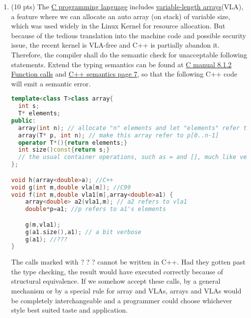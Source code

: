 \documentclass[10pt]{article}
\newcommand{\infertext}[2]{\infer{{\textrm{#1}}}{#2}}
\begin{document}
\begin{enumerate}
\begin{enumerate}
\begin{enumerate}
    \item (2 pts) \textsf{e1[e2]}
    \\
    \[
      \infertext{O,M,C $\vdash$ e1[e2]: Array(A)}{O,M,C \vdash e_1: Array(A) \quad O,M,C \vdash  e_2: Int}
    \]
    \item (4 pts) \textsf{e1[e2] $<$- e3}. Assume the type of the whole expression is the type of \textsf{e1}.
    \\
    \[
      \infertext{O,M,C $\vdash$ e1[e2] $<$- e3 : Array(A)}{O,M,C \vdash e_1: Array(A) \quad O,M,C \vdash  e_2: Int \quad O,M,C \vdash  e_3: T' \quad T' \leq A}
    \]
\end{enumerate}
\end{enumerate}
\item (10 pts) The \href{http://www.open-std.org/jtc1/sc22/wg14/www/docs/n1124.pdf}{C programming language} includes \href{https://outflux.net/slides/2018/lss/danger.pdf}{variable-length arrays}(VLA), a feature where we can allocate an auto array (on stack) of variable size, which was used widely in the Linux Kernel for resource allocation. But because of the tedious translation into the machine code and possible security issue, the recent kernel is VLA-free and C++ is partially abandon it. Therefore, the compiler shall do the semantic check for unacceptable following statements. Extend the typing semantics can be found at \href{http://www.softlab.ntua.gr/~nickie/Papers/papaspyrou-1998-fscpl.pdf}{C manual 8.1.2 Function calls} and \href{https://users.cs.northwestern.edu/~jesse/course/eecs230-wi18/lec/06semantics.pdf}{C++ semantics page 7}, so that the following C++ code will emit a semantic error.
\begin{lstlisting}[language=C++]
template<class T>class array{ 
  int s;
  T* elements; 
public:
  array(int n); // allocate "n" elements and let "elements" refer to them 
  array(T* p, int n); // make this array refer to p[0..n-1]
  operator T*(){return elements;}
  int size()const{return s;} 
  // the usual container operations, such as = and [], much like vector 
};

void h(array<double>a); //C++
void g(int m,double vla[m]); //C99
void f(int m,double vla1[m],array<double>a1) {
    array<double> a2(vla1,m); // a2 refers to vla1 
    double*p=a1; //p refers to a1's elements

    g(m,vla1);
    g(a1.size(),a1); // a bit verbose 
    g(a1); //???
}
\end{lstlisting}
The calls marked with ? ? ? cannot be written in C++. Had they gotten past the type checking, the result would have executed correctly because of structural equivalence. If we somehow accept these calls, by a general mechanism or by a special rule for array and VLAs, arrays and VLAs would be completely interchangeable and a programmer could choose whichever style best suited taste and application.
\end{enumerate}
\end{document}
